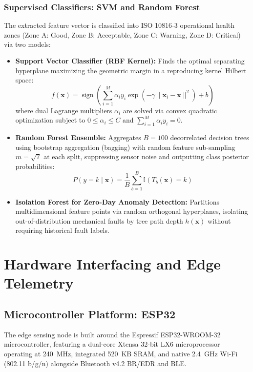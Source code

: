 \documentclass[12pt,a4paper,oneside]{report}
\begin{document}
\subsection{Supervised Classifiers: SVM and Random Forest}
The extracted feature vector is classified into ISO 10816-3 operational health zones (Zone A: Good, Zone B: Acceptable, Zone C: Warning, Zone D: Critical) via two models:
\begin{itemize}[leftmargin=*]
    \item \textbf{Support Vector Classifier (RBF Kernel):} Finds the optimal separating hyperplane maximizing the geometric margin in a reproducing kernel Hilbert space:
    \begin{equation}
        f(\mathbf{x}) = \operatorname{sign}\left(\sum_{i=1}^M \alpha_i y_i \exp\left(-\gamma \|\mathbf{x}_i - \mathbf{x}\|^2\right) + b\right)
    \end{equation}
    where dual Lagrange multipliers $\alpha_i$ are solved via convex quadratic optimization subject to $0 \le \alpha_i \le C$ and $\sum_{i=1}^M \alpha_i y_i = 0$.
    \item \textbf{Random Forest Ensemble:} Aggregates $B = 100$ decorrelated decision trees using bootstrap aggregation (bagging) with random feature sub-sampling $m = \sqrt{7}$ at each split, suppressing sensor noise and outputting class posterior probabilities:
    \begin{equation}
        P(y = k \mid \mathbf{x}) = \frac{1}{B} \sum_{b=1}^B \mathbb{I}\left(T_b(\mathbf{x}) = k\right)
    \end{equation}
    \item \textbf{Isolation Forest for Zero-Day Anomaly Detection:} Partitions multidimensional feature points via random orthogonal hyperplanes, isolating out-of-distribution mechanical faults by tree path depth $h(\mathbf{x})$ without requiring historical fault labels.
\end{itemize}

\newpage
\chapter{Hardware Interfacing and Edge Telemetry}

\section{Microcontroller Platform: ESP32}
The edge sensing node is built around the Espressif ESP32-WROOM-32 microcontroller, featuring a dual-core Xtensa 32-bit LX6 microprocessor operating at 240~MHz, integrated 520~KB SRAM, and native 2.4~GHz Wi-Fi (802.11 b/g/n) alongside Bluetooth v4.2 BR/EDR and BLE.
\end{document}
